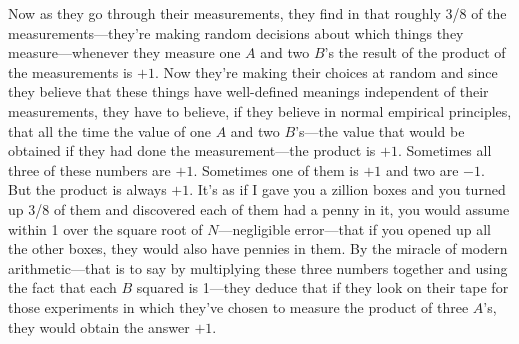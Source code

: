 \documentclass[12pt,nofootinbib]{revtex4}
\begin{document}
Now as they go through their measurements, they find in that roughly 3/8 of the measurements---they're making random decisions about which things they  measure---whenever they measure one $A$ and two $B$'s the result of the product of the measurements is $+1$. Now they're making their choices at random and since they believe that these things have well-defined meanings independent of their measurements, they have to believe, if they believe in normal empirical principles, that all the time the value of one $A$ and two $B$'s---the value that would be obtained if they had done the measurement---the product is $+1$. Sometimes all three of these numbers are $+1$. Sometimes one of them is $+1$ and two are $-1$. But the product is always $+1$. It's as if I gave you a zillion boxes and you turned up 3/8 of them and discovered each of them had a penny in it, you would assume within 1 over the square root of $N$---negligible error---that if you opened up all the other boxes, they would also have pennies in them. By the miracle of modern arithmetic---that is to say by multiplying these three numbers together and using the fact that each $B$ squared is 1---they deduce that if they look on their tape for those experiments in which they've chosen to measure the product of three $A$'s, they would obtain the answer $+1$.
\end{document}
